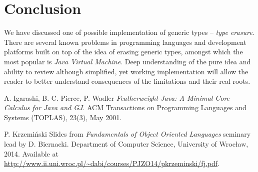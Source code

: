 \documentclass{article}[12pt]
\begin{document}
\section{Conclusion}

We have discussed one of possible implementation of generic
types -- \emph{type erasure}. There are several known problems
in programming languages and development platforms built on top
of the idea of erasing generic types, amongst which the most
popular is \emph{Java Virtual Machine}. Deep understanding of
the pure idea and ability to review although simplified,
yet working implementation will allow the reader to better
understand consequences of the limitations and their real roots. 

\begin{thebibliography}{1}

   A. Igarashi, B. C. Pierce, P. Wadler
  {\em Featherweight Java: A Minimal Core Calculus for Java and GJ}.
  ACM Transactions on Programming Languages and Systems (TOPLAS), 23(3), May 2001.

   P. Krzemiński Slides from {\em Fundamentals of
  Object Oriented Languages} seminary lead by D. Biernacki.
  Department of Computer Science, University of Wrocław, 2014.
  Available at
  \url{http://www.ii.uni.wroc.pl/~dabi/courses/PJZO14/pkrzeminski/fj.pdf}.

\end{thebibliography}
\end{document}
